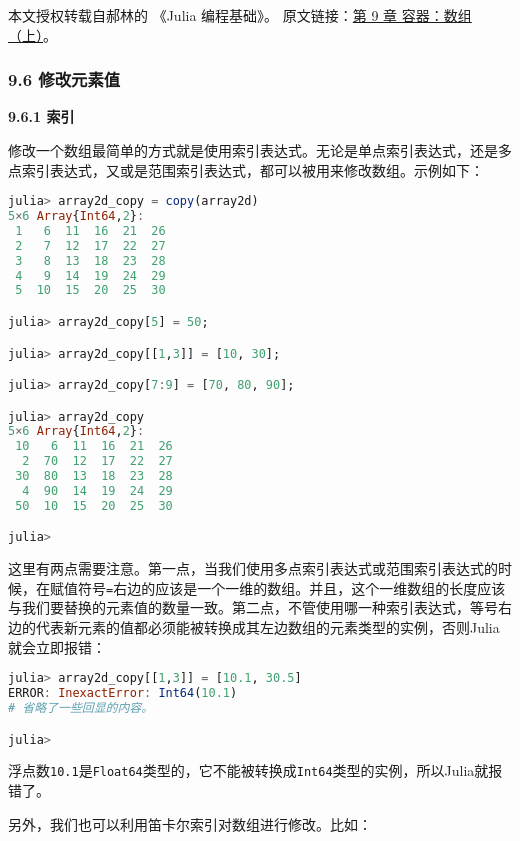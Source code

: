 
本文授权转载自郝林的 《Julia 编程基础》。 原文链接：\href{https://github.com/hyper0x/JuliaBasics/blob/master/book/ch09.md}{第 9 章 容器：数组（上）}。


\subsubsection{9.6 修改元素值}

\textbf{9.6.1 索引}

修改一个数组最简单的方式就是使用索引表达式。无论是单点索引表达式，还是多点索引表达式，又或是范围索引表达式，都可以被用来修改数组。示例如下：

\begin{lstlisting}[language=julia]
julia> array2d_copy = copy(array2d)
5×6 Array{Int64,2}:
 1   6  11  16  21  26
 2   7  12  17  22  27
 3   8  13  18  23  28
 4   9  14  19  24  29
 5  10  15  20  25  30

julia> array2d_copy[5] = 50;

julia> array2d_copy[[1,3]] = [10, 30];

julia> array2d_copy[7:9] = [70, 80, 90];

julia> array2d_copy
5×6 Array{Int64,2}:
 10   6  11  16  21  26
  2  70  12  17  22  27
 30  80  13  18  23  28
  4  90  14  19  24  29
 50  10  15  20  25  30

julia> 
\end{lstlisting}

这里有两点需要注意。第一点，当我们使用多点索引表达式或范围索引表达式的时候，在赋值符号\verb|=|右边的应该是一个一维的数组。并且，这个一维数组的长度应该与我们要替换的元素值的数量一致。第二点，不管使用哪一种索引表达式，等号右边的代表新元素的值都必须能被转换成其左边数组的元素类型的实例，否则Julia就会立即报错：

\begin{lstlisting}[language=julia]
julia> array2d_copy[[1,3]] = [10.1, 30.5]
ERROR: InexactError: Int64(10.1)
# 省略了一些回显的内容。

julia> 
\end{lstlisting}

浮点数\verb|10.1|是\verb|Float64|类型的，它不能被转换成\verb|Int64|类型的实例，所以Julia就报错了。

另外，我们也可以利用笛卡尔索引对数组进行修改。比如：

